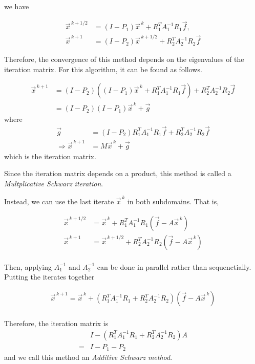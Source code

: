 we have

\begin{align*}
    \vec{x}^{\, k + 1/2} &= (I - P_1)\vec{x}^{\, k} +
    R_1^T A_1^{-1} R_1\vec{f},\\
    \vec{x}^{\, k + 1} &=(I - P_2) \vec{x}^{\, k + 1/2} +
    R_2^T A_2^{-1} R_2 \vec{f}
\end{align*}

Therefore, the convergence of this method depends on the eigenvalues of the iteration matrix. For this algorithm, it can be found as follows.

\begin{align*}
    \vec{x}^{\, k + 1} &= (I - P_2) \left((I - P_1)\vec{x}^{\, k} +
    R_1^T A_1^{-1} R_1\vec{f}\right) +
    R_2^T A_2^{-1} R_2 \vec{f}\\
    &= (I - P_2)(I - P_1) \vec{x}^{\, k}+ \vec{g}
\end{align*}
where
\begin{align*}
    \vec{g}&=(I - P_2)R_1^T A_1^{-1} R_1\vec{f} + R_2^T A_2^{-1} R_2 \vec{f}\\
    \Rightarrow \vec{x}^{\, k + 1} &= M\vec{x}^{\, k} + \vec{g}
\end{align*}
which is the iteration matrix.

Since the iteration matrix depends on a product, this method is called a \emph{Multplicative Schwarz iteration}.

Instead, we can use the last iterate $\vec{x}^{\, k}$ in both subdomains. That is,


\begin{align*}
    \vec{x}^{\, k + 1/2} &= \vec{x}^{\, k} +
    R_1^T A_1^{-1} R_1
    \left(\vec{f} - A\vec{x}^{\, k}\right)\\
    \vec{x}^{\, k + 1} &= \vec{x}^{\, k + 1/2} +
    R_2^T A_2^{-1} R_2
    \left(\vec{f} - A\vec{x}^{\, k}\right)\\
\end{align*}

Then, applying $A_1^{-1}$ and $A_2^{-1}$ can be done in parallel rather than sequenctially. Putting the iterates together

\begin{align*}
    \vec{x}^{\, k + 1} = \vec{x}^{\, k} +
    \left(R_1^T A_1^{-1} R_1 + R_2^T A_2^{-1} R_2\right)
    \left(\vec{f} - A\vec{x}^{\, k}\right)\\
\end{align*}

Therefore, the iteration matrix is
\begin{align*}
    &I - \left(R_1^T A_1^{-1} R_1 + R_2^T A_2^{-1} R_2\right)A\\
    = &I -P_1-P_2
\end{align*}
and we call this method an \emph{Additive Schwarz method}.

